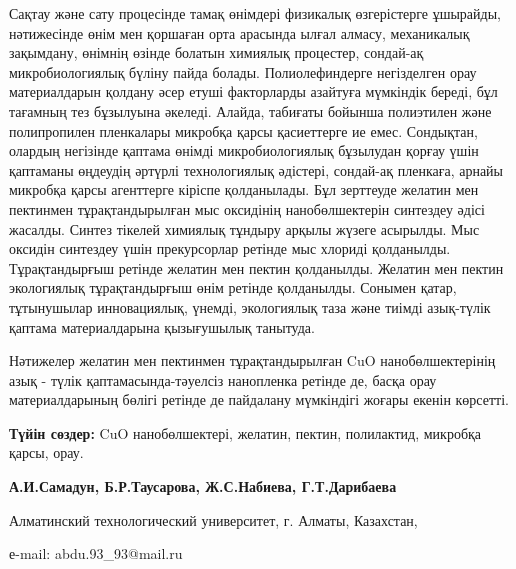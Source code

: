 Сақтау және сату процесінде тамақ өнімдері физикалық өзгерістерге
ұшырайды, нәтижесінде өнім мен қоршаған орта арасында ылғал алмасу,
механикалық зақымдану, өнімнің өзінде болатын химиялық процестер,
сондай-ақ микробиологиялық бүліну пайда болады. Полиолефиндерге
негізделген орау материалдарын қолдану әсер етуші факторларды азайтуға
мүмкіндік береді, бұл тағамның тез бұзылуына әкеледі. Алайда, табиғаты
бойынша полиэтилен және полипропилен пленкалары микробқа қарсы
қасиеттерге ие емес. Сондықтан, олардың негізінде қаптама өнімді
микробиологиялық бұзылудан қорғау үшін қаптаманы өңдеудің әртүрлі
технологиялық әдістері, сондай-ақ пленкаға, арнайы микробқа қарсы
агенттерге кіріспе қолданылады. Бұл зерттеуде желатин мен пектинмен
тұрақтандырылған мыс оксидінің нанобөлшектерін синтездеу әдісі жасалды.
Синтез тікелей химиялық тұндыру арқылы жүзеге асырылды. Мыс оксидін
синтездеу үшін прекурсорлар ретінде мыс хлориді қолданылды.
Тұрақтандырғыш ретінде желатин мен пектин қолданылды. Желатин мен пектин
экологиялық тұрақтандырғыш өнім ретінде қолданылды. Сонымен қатар,
тұтынушылар инновациялық, үнемді, экологиялық таза және тиімді
азық-түлік қаптама материалдарына қызығушылық танытуда.

Нәтижелер желатин мен пектинмен тұрақтандырылған CuO нанобөлшектерінің
азық - түлік қаптамасында-тәуелсіз нанопленка ретінде де, басқа орау
материалдарының бөлігі ретінде де пайдалану мүмкіндігі жоғары екенін
көрсетті.

{\bfseries Түйін сөздер:} CuO нанобөлшектері, желатин, пектин, полилактид,
микробқа қарсы, орау.


\begin{center}
{\bfseries А.И.Самадун, Б.Р.Таусарова, Ж.С.Набиева, Г.Т.Дарибаева}

Алматинский технологический университет, г. Алматы, Казахстан,

е-mail: abdu.93\_93@mail.ru
\end{center}

